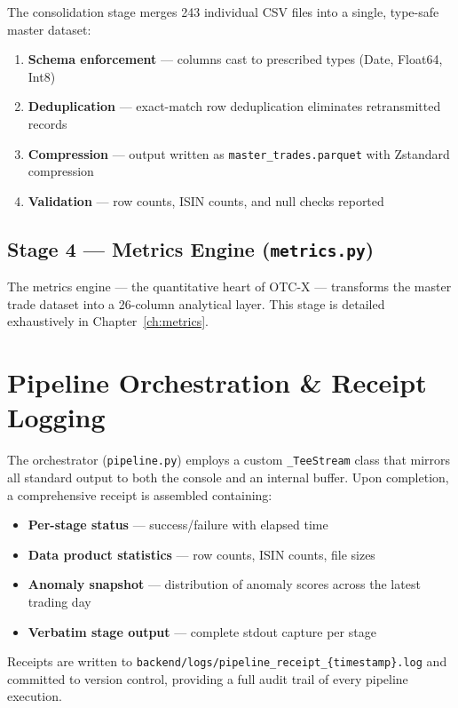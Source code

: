 \documentclass[
  11pt,
  a4paper,
  twoside,
  openany
]{report}
\begin{document}
The consolidation stage merges 243 individual CSV files into a single, type-safe master dataset:

\begin{enumerate}
  \item \textbf{Schema enforcement} — columns cast to prescribed types (Date, Float64, Int8)
  \item \textbf{Deduplication} — exact-match row deduplication eliminates retransmitted records
  \item \textbf{Compression} — output written as \texttt{master\_trades.parquet} with Zstandard compression
  \item \textbf{Validation} — row counts, ISIN counts, and null checks reported
\end{enumerate}

\subsection{Stage 4 — Metrics Engine (\texttt{metrics.py})}

The metrics engine — the quantitative heart of OTC-X — transforms the master trade dataset into a 26-column analytical layer.  This stage is detailed exhaustively in Chapter~\ref{ch:metrics}.

\section{Pipeline Orchestration \& Receipt Logging}

The orchestrator (\texttt{pipeline.py}) employs a custom \texttt{\_TeeStream} class that mirrors all standard output to both the console and an internal buffer.  Upon completion, a comprehensive receipt is assembled containing:

\begin{itemize}
  \item \textbf{Per-stage status} — success/failure with elapsed time
  \item \textbf{Data product statistics} — row counts, ISIN counts, file sizes
  \item \textbf{Anomaly snapshot} — distribution of anomaly scores across the latest trading day
  \item \textbf{Verbatim stage output} — complete stdout capture per stage
\end{itemize}

Receipts are written to \texttt{backend/logs/pipeline\_receipt\_\{timestamp\}.log} and committed to version control, providing a full audit trail of every pipeline execution.
\end{document}
